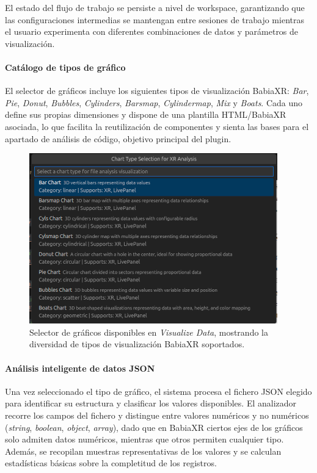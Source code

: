 \documentclass[a4paper, 12pt]{book}
\begin{document}
El estado del flujo de trabajo se persiste a nivel de workspace, garantizando que las configuraciones intermedias se mantengan entre sesiones de trabajo mientras el usuario experimenta con diferentes combinaciones de datos y parámetros de visualización.

\paragraph{Catálogo de tipos de gráfico}
El selector de gráficos incluye los siguientes tipos de visualización BabiaXR: \emph{Bar}, \emph{Pie}, \emph{Donut}, \emph{Bubbles}, \emph{Cylinders}, \emph{Barsmap}, \emph{Cylindermap}, \emph{Mix} y \emph{Boats}. Cada uno define sus propias dimensiones y dispone de una plantilla HTML/BabiaXR asociada, lo que facilita la reutilización de componentes y sienta las bases para el apartado de análisis de código, objetivo principal del plugin.


\begin{figure}[H]
\centering
\includegraphics[width=0.58\linewidth]{img/graficos_babiaxr.png}
\caption{Selector de gráficos disponibles en \emph{Visualize Data}, mostrando la diversidad de tipos de visualización BabiaXR soportados.}
\label{fig:visualize-chart-selector}
\end{figure}

\paragraph{Análisis inteligente de datos JSON}
Una vez seleccionado el tipo de gráfico, el sistema procesa el fichero JSON elegido para identificar su estructura y clasificar los valores disponibles. El analizador recorre los campos del fichero y distingue entre valores numéricos y no numéricos (\emph{string}, \emph{boolean}, \emph{object}, \emph{array}), dado que en BabiaXR ciertos ejes de los gráficos solo admiten datos numéricos, mientras que otros permiten cualquier tipo. Además, se recopilan muestras representativas de los valores y se calculan estadísticas básicas sobre la completitud de los registros.
\end{document}
